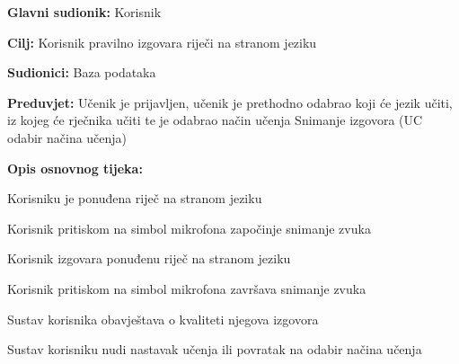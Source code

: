 					\noindent {}
					\begin{packed_item}

						\item \textbf{Glavni sudionik: } Korisnik
						\item \textbf{Cilj: } Korisnik pravilno izgovara riječi na stranom jeziku
						\item \textbf{Sudionici: } Baza podataka
						\item \textbf{Preduvjet: } Učenik je prijavljen, učenik je prethodno odabrao koji će jezik učiti, iz kojeg će rječnika učiti te je odabrao način učenja Snimanje izgovora (UC odabir načina učenja)
						\item  \textbf{Opis osnovnog tijeka:} 
						
						\item[] \begin{packed_enum}

							\item Korisniku je ponuđena riječ na stranom jeziku
							\item Korisnik pritiskom na simbol mikrofona započinje snimanje zvuka
							\item Korisnik izgovara ponuđenu riječ na stranom jeziku
							\item Korisnik pritiskom na simbol mikrofona završava snimanje zvuka
							\item Sustav korisnika obavještava o kvaliteti njegova izgovora
							\item Sustav korisniku nudi nastavak učenja ili povratak na odabir načina učenja

						\end{packed_enum}

					\end{packed_item}


